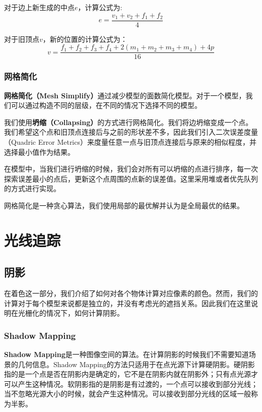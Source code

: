 \documentclass[openany]{progbookcn}
\begin{document}
对于边上新生成的中点$e$，计算公式为:
\begin{equation}
	e=\frac{v_1+v_2+f_1+f_2}{4}
\end{equation}

对于旧顶点$v$，新的位置的计算公式为：
\begin{equation}
	v=\frac{f_1+f_2+f_3+f_4+2(m_1+m_2+m_3+m_4)+4p}{16}
\end{equation}

\section{网格简化}
\textbf{网格简化（Mesh Simplify）}通过减少模型的面数简化模型。对于一个模型，我们可以通过构造不同的层级，在不同的情况下选择不同的模型。

我们使用\textbf{坍缩（Collapsing）}的方式进行网格简化。我们将边坍缩变成一个点。我们希望这个点和旧顶点连接后与之前的形状差不多，因此我们引入二次误差度量（Quadric Error Metrics）来度量任意一点与旧顶点连接后与原来的相似程度，并选择最小值作为结果。

在模型中，当我们进行坍缩的时候，我们会对所有可以坍缩的点进行排序，每一次探索误差最小的点后，更新这个点周围的点新的误差值。这里采用堆或者优先队列的方式进行实现。

网格简化是一种贪心算法，我们使用局部的最优解并认为是全局最优的结果。

\part{光线追踪}

\chapter{阴影}

在着色这一部分，我们介绍了如何对各个物体计算对应像素的颜色。然而，我们的计算对于每个模型来说都是独立的，并没有考虑光的遮挡关系。因此我们在这里说明在光栅化的情况下，如何计算阴影。

\section{Shadow Mapping}
\textbf{Shadow Mapping}是一种图像空间的算法。在计算阴影的时候我们不需要知道场景的几何信息。Shadow Mapping的方法只适用于在点光源下计算硬阴影。硬阴影指的是一个点是否在阴影内是确定的，它不是在阴影内就在阴影外；只有点光源才可以产生这种情况。软阴影指的是阴影是有过渡的，一个点可以接收到部分光线；当不忽略光源大小的时候，就会产生这种情况。可以接收到部分光线的区域一般称为半影。
\end{document}
